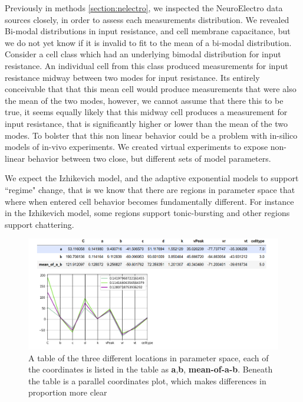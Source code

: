 Previously in methods \ref{section:nelectro}, we  inspected the NeuroElectro data sources closely, in order to assess each measurements distribution.
We revealed Bi-modal distributions in input resistance, and cell membrane capacitance, but we do not yet know if it is invalid to fit to the mean of a bi-modal distribution.
Consider a  cell class which had an underlying bimodal distribution for input resistance. An individual cell from this class produced measurements for input resistance midway between two modes for input resistance.
Its entirely conceivable that that this mean cell would produce measurements that were also the mean of the two modes, however, we cannot assume that there this to be true, it seems equally likely that this midway cell produces a measurement for input resistance, that is significantly higher or lower than the mean of the two modes. To bolster that this non linear behavior could be a problem with in-silico models of in-vivo experiments.
We created virtual experiments to expose non-linear behavior between two  close, but different sets of model parameters.


We expect the Izhikevich model, and the adaptive exponential models to support ``regime" change, that is we know that there are regions in parameter space that where when entered cell behavior becomes fundamentally different. For instance in the Izhikevich model, some regions support tonic-bursting and other regions support chattering. 

\begin{figure}
    \centering
    \includegraphics{figures/mean_model_mean_measure_ment_params.png}
    \caption[sets of coordinates that describe three different points in parameters space]{A table of the three different locations in parameter space, each of the coordinates is listed in the table as \textbf{a},\textbf{b}, \textbf{mean-of-a-b}. Beneath the table is a parallel coordinates plot, which makes differences in proportion more clear}
    \label{fig:my_label}
\end{figure}

